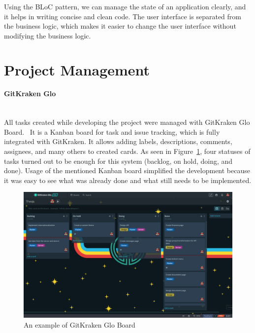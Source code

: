 Using the BLoC pattern, we can manage the state of an application clearly, and it helps in writing concise and clean code. The user interface is separated from the business logic, which makes it easier to change the user interface without modifying the business logic.


\section{Project Management}
\paragraph{\large{GitKraken Glo}}\mbox{}\\[2pt]
All tasks created while developing the project were managed with GitKraken Glo Board.~\cite{gitkraken-glo} It is a Kanban board for task and issue tracking, which is fully integrated with GitKraken. It allows adding labels, descriptions, comments, assignees, and many others to created cards. As seen in Figure~\ref{fig:glo-board}, four statuses of tasks turned out to be enough for this system (backlog, on hold, doing, and done). Usage of the mentioned Kanban board simplified the development because it was easy to see what was already done and what still needs to be implemented.

\begin{figure}[htb]
    \centering
    \includegraphics[width=.98\textwidth]{fig04/glo_board.png}
    \caption{An example of GitKraken Glo Board} \label{fig:glo-board}
\end{figure}

